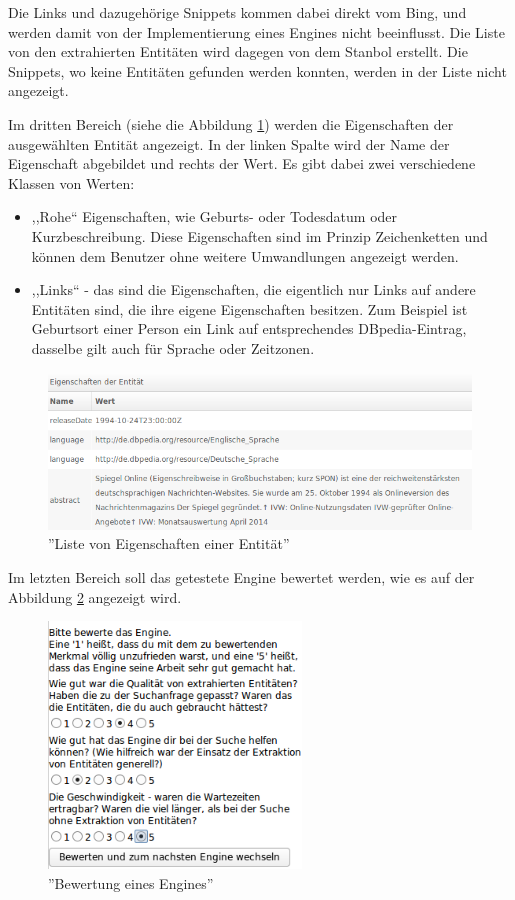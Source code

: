 Die Links und dazugehörige Snippets kommen dabei direkt vom Bing, und werden damit von der Implementierung eines Engines nicht beeinflusst. Die Liste von den extrahierten Entitäten wird dagegen von dem Stanbol erstellt. Die Snippets, wo keine Entitäten gefunden werden konnten, werden in der Liste nicht angezeigt.

Im dritten Bereich (siehe die Abbildung \ref{fig:eval-props}) werden die Eigenschaften der ausgewählten Entität angezeigt. In der linken Spalte wird der Name der Eigenschaft abgebildet und rechts der Wert. Es gibt dabei zwei verschiedene Klassen von Werten:
\begin{itemize}
\item ,,Rohe`` Eigenschaften, wie Geburts- oder Todesdatum oder Kurzbeschreibung. Diese Eigenschaften sind im Prinzip Zeichenketten und können dem Benutzer ohne weitere Umwandlungen angezeigt werden.
\item ,,Links`` - das sind die Eigenschaften, die eigentlich nur Links auf andere Entitäten sind, die ihre eigene Eigenschaften besitzen. Zum Beispiel ist Geburtsort einer Person ein Link auf entsprechendes DBpedia-Eintrag, dasselbe gilt auch für Sprache oder Zeitzonen.
\end{itemize}

\begin{figure}
\centering
\includegraphics[width=1\textwidth]{Bilder/eval-step03.png}
\caption{''Liste von Eigenschaften einer Entität''}
\label{fig:eval-props}
\end{figure}

Im letzten Bereich soll das getestete Engine bewertet werden, wie es auf der Abbildung \ref{fig:bewertung} angezeigt wird.

\begin{figure}
\centering
\includegraphics[width=0.6\textwidth]{Bilder/bewertung-eval.png}
\caption{''Bewertung eines Engines''}
\label{fig:bewertung}
\end{figure}

